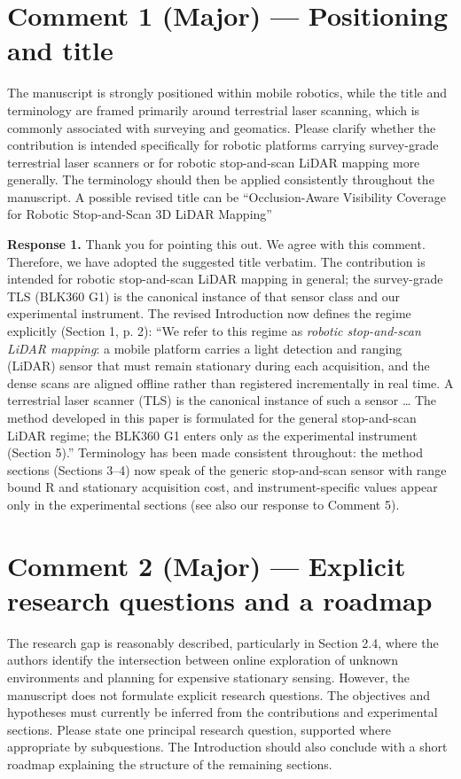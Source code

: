 \section*{Comment 1 (Major) — Positioning and title}

\begin{quoting}
The manuscript is strongly positioned within mobile robotics, while the title and terminology are framed primarily around terrestrial laser scanning, which is commonly associated with surveying and geomatics. Please clarify whether the contribution is intended specifically for robotic platforms carrying survey-grade terrestrial laser scanners or for robotic stop-and-scan LiDAR mapping more generally. The terminology should then be applied consistently throughout the manuscript. A possible revised title can be “Occlusion-Aware Visibility Coverage for Robotic Stop-and-Scan 3D LiDAR Mapping”
\end{quoting}

\textbf{Response 1.} Thank you for pointing this out. We agree with this comment. Therefore, we have adopted the suggested title verbatim. The contribution is intended for robotic stop-and-scan LiDAR mapping in general; the survey-grade TLS (BLK360 G1) is the canonical instance of that sensor class and our experimental instrument. The revised Introduction now defines the regime explicitly (Section 1, p. 2): “We refer to this regime as \emph{robotic stop-and-scan LiDAR mapping}: a mobile platform carries a light detection and ranging (LiDAR) sensor that must remain stationary during each acquisition, and the dense scans are aligned offline rather than registered incrementally in real time. A terrestrial laser scanner (TLS) is the canonical instance of such a sensor … The method developed in this paper is formulated for the general stop-and-scan LiDAR regime; the BLK360 G1 enters only as the experimental instrument (Section 5).” Terminology has been made consistent throughout: the method sections (Sections 3–4) now speak of the generic stop-and-scan sensor with range bound R and stationary acquisition cost, and instrument-specific values appear only in the experimental sections (see also our response to Comment 5).

\section*{Comment 2 (Major) — Explicit research questions and a roadmap}

\begin{quoting}
The research gap is reasonably described, particularly in Section 2.4, where the authors identify the intersection between online exploration of unknown environments and planning for expensive stationary sensing. However, the manuscript does not formulate explicit research questions. The objectives and hypotheses must currently be inferred from the contributions and experimental sections. Please state one principal research question, supported where appropriate by subquestions. The Introduction should also conclude with a short roadmap explaining the structure of the remaining sections.
\end{quoting}

